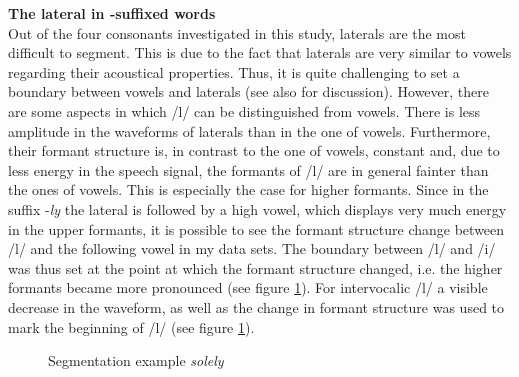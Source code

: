 \textbf {The lateral in -suffixed words} \label{ly-segmentation}\\




Out of the four consonants investigated in this study, laterals are the most difficult to segment. This is due to the fact that laterals are very similar to vowels regarding their acoustical properties. Thus, it is quite challenging to set a boundary between vowels and laterals (see also \citet[chapter 7]{Machac.2009} for discussion). However, there are some aspects in which /l/ can be distinguished from vowels. There is less amplitude in the waveforms of laterals than in the one of vowels.  Furthermore, their formant structure is, in contrast to the one of vowels, constant and, due to less energy in the speech signal, the formants of /l/ are in general fainter than the ones of vowels. This is especially the case for higher formants. Since in the suffix -\textit{ly} the lateral is followed by a high vowel, which displays very much energy in the upper formants, it is possible to see the formant structure change between /l/ and the following vowel in my data sets. The boundary between /l/ and /i/ was thus set at the point at which the formant structure changed, i.e. the higher formants became more pronounced (see figure \ref{fig:segmentation solely}). For intervocalic /l/ a visible decrease in the waveform, as well as the change in formant structure was used to mark the beginning of /l/ (see figure \ref{fig:segmentation solely}).
 
\begin{figure} [h!]
	\centering
	\caption{Segmentation example \textit{solely}}
	\label{fig:segmentation solely}
\end{figure}


